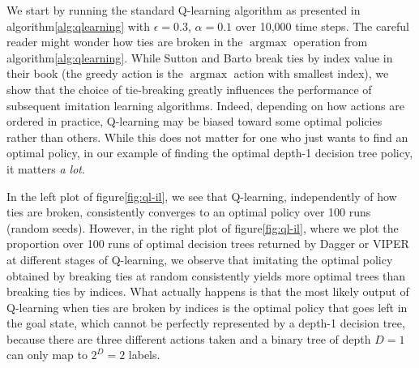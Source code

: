 We start by running the standard Q-learning algorithm as presented in algorithm\ref{alg:qlearning} with $\epsilon=0.3$, $\alpha=0.1$ over 10,000 time steps.
The careful reader might wonder how ties are broken in the $\operatorname{argmax}$ operation from algorithm\ref{alg:qlearning}.
While Sutton and Barto break ties by index value in their book\cite{sutton} (the greedy action is the $\operatorname{argmax}$ action with smallest index), we show that the choice of tie-breaking greatly influences the performance of subsequent imitation learning algorithms.
Indeed, depending on how actions are ordered in practice, Q-learning may be biased toward some optimal policies rather than others.
While this does not matter for one who just wants to find an optimal policy, in our example of finding the optimal depth-1 decision tree policy, it matters \textit{a lot}.

In the left plot of figure\ref{fig:ql-il}, we see that Q-learning, independently of how ties are broken, consistently converges to an optimal policy over 100 runs (random seeds).
However, in the right plot of figure\ref{fig:ql-il}, where we plot the proportion over 100 runs of optimal decision trees returned by Dagger or VIPER at different stages of Q-learning, we observe that imitating the optimal policy obtained by breaking ties at random consistently yields more optimal trees than breaking ties by indices.
What actually happens is that the most likely output of Q-learning when ties are broken by indices is the optimal policy that goes left in the goal state,
which cannot be perfectly represented by a depth-1 decision tree, because there are three different actions taken and a binary tree of depth $D=1$ can only map to $2^D=2$ labels.


